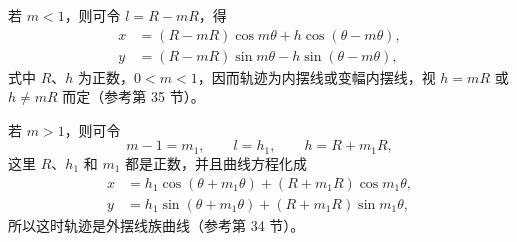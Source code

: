 若 $m<1$，则可令 $l=R-mR$，得
\begin{align*}
  x &= (R-mR)\cos m\theta + h\cos(\theta - m\theta), \\
  y &= (R-mR)\sin m\theta - h\sin(\theta - m\theta),
\end{align*}
式中 $R$、$h$ 为正数，$0<m<1$，因而轨迹为内摆线或变幅内摆线，视 $h=mR$ 或 $h\neq mR$ 而定（参考第 35 节）。

若 $m>1$，则可令
\[
  m-1=m_1,\qquad l=h_1,\qquad h=R+m_1 R,
\]
这里 $R$、$h_1$ 和 $m_1$ 都是正数，并且曲线方程化成
\begin{align*}
  x &= h_1\cos(\theta + m_1\theta) + (R+m_1 R)\cos m_1\theta, \\
  y &= h_1\sin(\theta + m_1\theta) + (R+m_1 R)\sin m_1\theta,
\end{align*}
所以这时轨迹是外摆线族曲线（参考第 34 节）。
